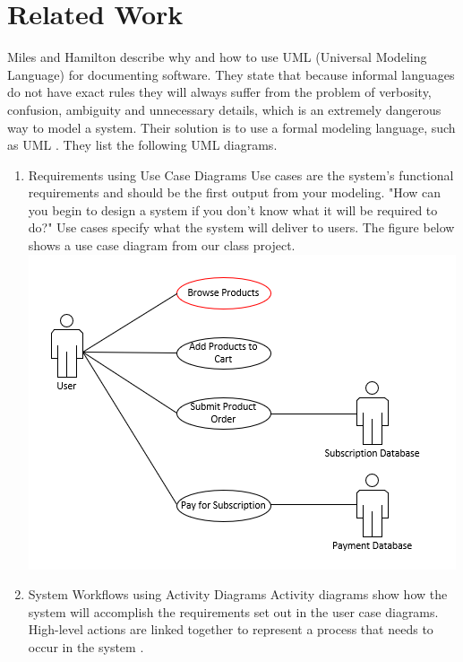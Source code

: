 \documentclass{acm_proc_article-sp}
\begin{document}
\section{Related Work}
Miles and Hamilton describe why and how to use UML (Universal Modeling Language) for documenting software. They state that because informal languages do not have exact rules they will always suffer from the problem of verbosity, confusion, ambiguity and unnecessary details, which is an extremely dangerous way to model a system. Their solution is to use a formal modeling language, such as UML \cite{Lamport:UML}.
\newline
They list the following UML diagrams\cite{Lamport:UML}.
\begin{enumerate}
	\item Requirements using Use Case Diagrams
	\newline
	Use cases are the system's functional requirements and should be the first output from your modeling. "How can you begin to design a system if you don't know what it will be required to do?" \cite{Lamport:UML} Use cases specify what the system will deliver to users.
	\newline
	The figure below shows a use case diagram from our class project.
	\newline
	\includegraphics[scale=0.5]{UseCaseDiagrams}
	\item System Workflows using Activity Diagrams
	\newline
	Activity diagrams show how the system will accomplish the requirements set out in the user case diagrams. High-level actions are linked together to represent a process that needs to occur in the system \cite{Lamport:UML}.

\end{enumerate}
\end{document}

